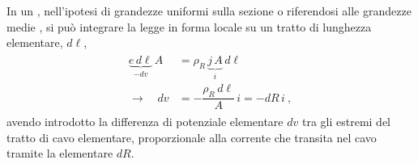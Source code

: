 \documentclass[letterpaper,10pt,italian]{jupyterBook}
\begin{document}
\sphinxAtStartPar
In un {\hyperref[\detokenize{ch/electromagnetism/electric-current:electric-current-cable}]{}}, nell’ipotesi di grandezze uniformi sulla sezione \sphinxhyphen{} o riferendosi alle grandezze medie \sphinxhyphen{}, si può integrare la legge in forma locale su un tratto di lunghezza elementare, \(d \ell\),
\begin{equation*}
\begin{split}\begin{aligned}
 \underbrace{e \, d \ell}_{- d v} \, A & = \rho_R \, \underbrace{j \, A}_{i} \, d \ell \\
 \rightarrow \quad dv & = - \dfrac{\rho_R \, d \ell}{A} \, i = - dR \, i \ , 
\end{aligned}\end{split}
\end{equation*}
\sphinxAtStartPar
avendo introdotto la differenza di potenziale elementare \(d v\) tra gli estremi del tratto di cavo elementare, proporzionale alla corrente che transita nel cavo tramite la  elementare \(dR\).
\end{document}
